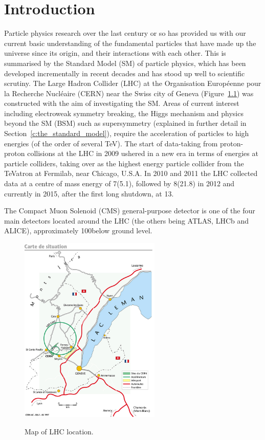 \chapter{Introduction}
\label{c:introduction}
Particle physics research over the last century or so has provided us with our current basic understanding of
the fundamental particles that have made up the universe since its origin, and their interactions with each
other. This is summarised by the Standard Model (SM) of particle physics, which has been developed
incrementally in recent decades and has stood up well to scientific scrutiny. The Large Hadron Collider (LHC)
at the Organisation Europ\'{e}enne pour la Recherche Nucl\'{e}aire (CERN) near the Swiss city of Geneva
(Figure~\ref{fig:LHC_map}) was constructed with the aim of investigating the SM. Areas of current interest
including electroweak symmetry breaking, the Higgs mechanism and physics beyond the SM (BSM) such as
supersymmetry (explained in further detail in Section~\ref{c:the_standard_model}), require the acceleration of
particles to high energies (of the order of several TeV). The start of data-taking from proton-proton
collisions at the LHC in 2009 ushered in a new era in terms of energies at particle colliders, taking over as
the highest energy particle collider from the TeVatron at Fermilab, near Chicago, U.S.A. In 2010 and 2011 the
LHC collected data at a centre of mass energy of 7\TeV (5.1\fbinv), followed by 8\TeV (21.8\fbinv) in 2012 and
currently in 2015, after the first long shutdown, at 13\TeV.

The Compact Muon Solenoid (CMS) general-purpose detector is one of the four main detectors located around the
LHC (the others being ATLAS, LHCb and ALICE), approximately 100\m below ground level.

\begin{figure}[!hbtp]
   \centering
     \includegraphics[width=0.6\textwidth]{Chapters/01_Introduction/Images/lhc-pho-1997-169.jpg}\\
     \caption{Map of LHC location.}
     \label{fig:LHC_map}
\end{figure}

